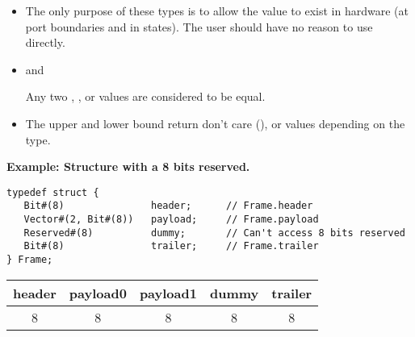 

\begin{itemize}
\item{}
The only purpose of these types  is to allow the value to exist in
hardware (at port boundaries and in states).  The user should have no
reason to use  directly.



\item{ and }

Any two , , or   values are considered to be equal.

	
\item{}

The upper and lower bound return  don't care (),  or
 values depending on the type.


\end{itemize}

{\bf Example: Structure with a 8 bits reserved.}


\begin{verbatim}
typedef struct {                      
   Bit#(8)               header;      // Frame.header
   Vector#(2, Bit#(8))   payload;     // Frame.payload
   Reserved#(8)          dummy;       // Can't access 8 bits reserved
   Bit#(8)               trailer;     // Frame.trailer
} Frame;                              
\end{verbatim}


\begin{tabular}{|c|c|c|c|c|}
\hline
header&payload0&payload1&dummy&trailer\\
\hline
8&8&8&8&8\\
\hline
\end{tabular} 


